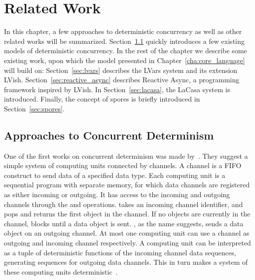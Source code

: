 \chapter{Related Work}\label{cha:related_work}

In this chapter, a few approaches to deterministic concurrency as well as other
related works will be summarized.  Section~\ref{sec:approaches} quickly
introduces a few existing models of deterministic concurrency. In the
rest of the chapter we describe some existing work, upon which the model
presented in Chapter~\ref{cha:core_language} will build on:
Section~\ref{sec:lvars} describes the LVars system and its extension LVish.
Section~\ref{sec:reactive_async} describes Reactive Async, a programming
framework inspired by LVish. In Section~\ref{sec:lacasa}, the LaCasa system is
introduced. Finally, the concept of spores is briefly introduced in
Section~\ref{sec:spores}.

\section{Approaches to Concurrent Determinism}%
\label{sec:approaches}

One of the first works on concurrent determinism was made by~\textcite{Kah74}.
They suggest a simple system of computing units connected by channels. A channel
is a FIFO construct to send data of a specified data type. Each computing unit
is a sequential program with separate memory, for which data channels are
registered as either incoming or outgoing. It has access to the incoming and
outgoing channels through the  and  operations.  
takes an incoming channel identifier, and pops and returns the first object in
the channel. If no objects are currently in the channel,  blocks until
a data object is sent. , as the name suggests, sends a data object on
an outgoing channel. At most one computing unit can use a channel as outgoing
and incoming channel respectively. A computing unit can be interpreted as a
tuple of deterministic functions of the incoming channel data sequences,
generating sequences for outgoing data channels. This in turn makes a system of
these computing units deterministic~\parencite{Kah74}.

